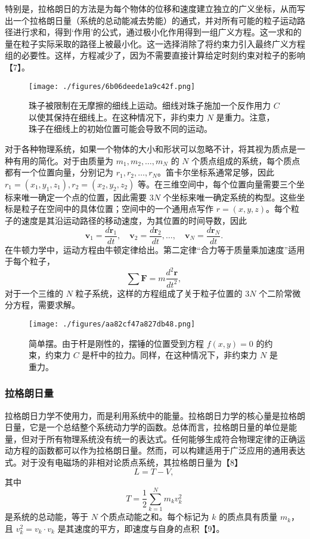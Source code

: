 特别是，拉格朗日的方法是为每个物体的位移和速度建立独立的广义坐标，从而写出一个拉格朗日量（系统的总动能减去势能）的通式，并对所有可能的粒子运动路径进行求和，得到‘作用’的公式，通过极小化作用得到一组广义方程。这一求和的量在粒子实际采取的路径上被最小化。这一选择消除了将约束力引入最终广义方程组的必要性。这样，方程减少了，因为不需要直接计算给定时刻约束对粒子的影响【7】。
\begin{figure}[ht]
\centering
\texttt{[image: ./figures/6b06deede1a9c42f.png]}
\caption{珠子被限制在无摩擦的细线上运动。细线对珠子施加一个反作用力 \( C \) 以使其保持在细线上。在这种情况下，非约束力 \( N \) 是重力。注意，珠子在细线上的初始位置可能会导致不同的运动。} \label{fig_LGL_2}
\end{figure}
对于各种物理系统，如果一个物体的大小和形状可以忽略不计，将其视为质点是一种有用的简化。对于由质量为 \( m_1, m_2, \dots, m_N \) 的 \( N \) 个质点组成的系统，每个质点都有一个位置向量，分别记为 \( r_1, r_2, \dots, r_N \)。笛卡尔坐标系通常足够，因此 \( r_1 = (x_1, y_1, z_1), r_2 = (x_2, y_2, z_2) \) 等。在三维空间中，每个位置向量需要三个坐标来唯一确定一个点的位置，因此需要 \( 3N \) 个坐标来唯一确定系统的构型。这些坐标是粒子在空间中的具体位置；空间中的一个通用点写作 \( r = (x, y, z) \)。每个粒子的速度是其沿运动路径的移动速度，为其位置的时间导数，因此
\[
\mathbf{v}_1 = \frac{d\mathbf{r}_1}{dt}, \quad \mathbf{v}_2 = \frac{d\mathbf{r}_2}{dt}, \dots, \quad \mathbf{v}_N = \frac{d\mathbf{r}_N}{dt}.~
\]
在牛顿力学中，运动方程由牛顿定律给出。第二定律“合力等于质量乘加速度”适用于每个粒子，
\[
\sum \mathbf{F} = m \frac{d^2 \mathbf{r}}{dt^2},~
\]
对于一个三维的 \( N \) 粒子系统，这样的方程组成了关于粒子位置的 \( 3N \) 个二阶常微分方程，需要求解。
\begin{figure}[ht]
\centering
\texttt{[image: ./figures/aa82cf47a827db48.png]}
\caption{简单摆。由于杆是刚性的，摆锤的位置受到方程 \( f(x, y) = 0 \) 的约束，约束力 \( C \) 是杆中的拉力。同样，在这种情况下，非约束力 \( N \) 是重力。} \label{fig_LGL_3}
\end{figure}
\subsubsection{拉格朗日量}
拉格朗日力学不使用力，而是利用系统中的能量。拉格朗日力学的核心量是拉格朗日量，它是一个总结整个系统动力学的函数。总体而言，拉格朗日量的单位是能量，但对于所有物理系统没有统一的表达式。任何能够生成符合物理定律的正确运动方程的函数都可以作为拉格朗日量。然而，可以构建适用于广泛应用的通用表达式。对于没有电磁场的非相对论质点系统，其拉格朗日量为【8】
\[
L = T - V,~
\]
其中
\[
T = \frac{1}{2} \sum_{k=1}^{N} m_k v_k^2~
\]
是系统的总动能，等于 \( N \) 个质点动能之和。每个标记为 \( k \) 的质点具有质量 \( m_k \)，且 \( v_k^2 = v_k \cdot v_k \) 是其速度的平方，即速度与自身的点积【9】。

